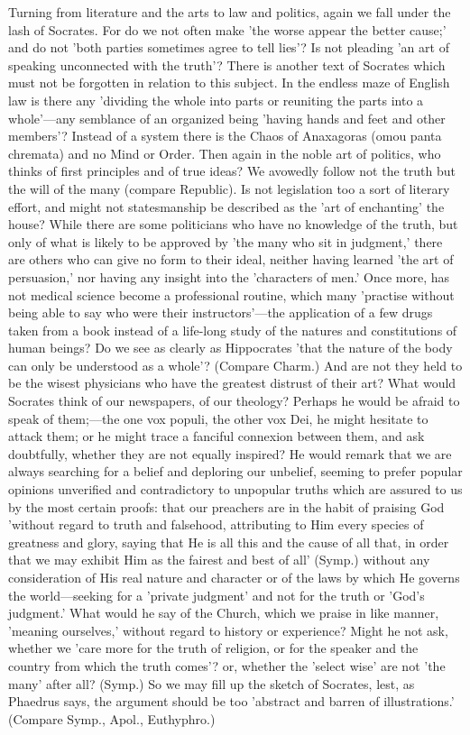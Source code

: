 \documentclass[11pt,letter]{article}
\begin{document}
\par  Turning from literature and the arts to law and politics, again we fall under the lash of Socrates. For do we not often make 'the worse appear the better cause;' and do not 'both parties sometimes agree to tell lies'? Is not pleading 'an art of speaking unconnected with the truth'? There is another text of Socrates which must not be forgotten in relation to this subject. In the endless maze of English law is there any 'dividing the whole into parts or reuniting the parts into a whole'—any semblance of an organized being 'having hands and feet and other members'? Instead of a system there is the Chaos of Anaxagoras (omou panta chremata) and no Mind or Order. Then again in the noble art of politics, who thinks of first principles and of true ideas? We avowedly follow not the truth but the will of the many (compare Republic). Is not legislation too a sort of literary effort, and might not statesmanship be described as the 'art of enchanting' the house? While there are some politicians who have no knowledge of the truth, but only of what is likely to be approved by 'the many who sit in judgment,' there are others who can give no form to their ideal, neither having learned 'the art of persuasion,' nor having any insight into the 'characters of men.' Once more, has not medical science become a professional routine, which many 'practise without being able to say who were their instructors'—the application of a few drugs taken from a book instead of a life-long study of the natures and constitutions of human beings? Do we see as clearly as Hippocrates 'that the nature of the body can only be understood as a whole'? (Compare Charm.) And are not they held to be the wisest physicians who have the greatest distrust of their art? What would Socrates think of our newspapers, of our theology? Perhaps he would be afraid to speak of them;—the one vox populi, the other vox Dei, he might hesitate to attack them; or he might trace a fanciful connexion between them, and ask doubtfully, whether they are not equally inspired? He would remark that we are always searching for a belief and deploring our unbelief, seeming to prefer popular opinions unverified and contradictory to unpopular truths which are assured to us by the most certain proofs: that our preachers are in the habit of praising God 'without regard to truth and falsehood, attributing to Him every species of greatness and glory, saying that He is all this and the cause of all that, in order that we may exhibit Him as the fairest and best of all' (Symp.) without any consideration of His real nature and character or of the laws by which He governs the world—seeking for a 'private judgment' and not for the truth or 'God's judgment.' What would he say of the Church, which we praise in like manner, 'meaning ourselves,' without regard to history or experience? Might he not ask, whether we 'care more for the truth of religion, or for the speaker and the country from which the truth comes'? or, whether the 'select wise' are not 'the many' after all? (Symp.) So we may fill up the sketch of Socrates, lest, as Phaedrus says, the argument should be too 'abstract and barren of illustrations.' (Compare Symp., Apol., Euthyphro.)
\end{document}
